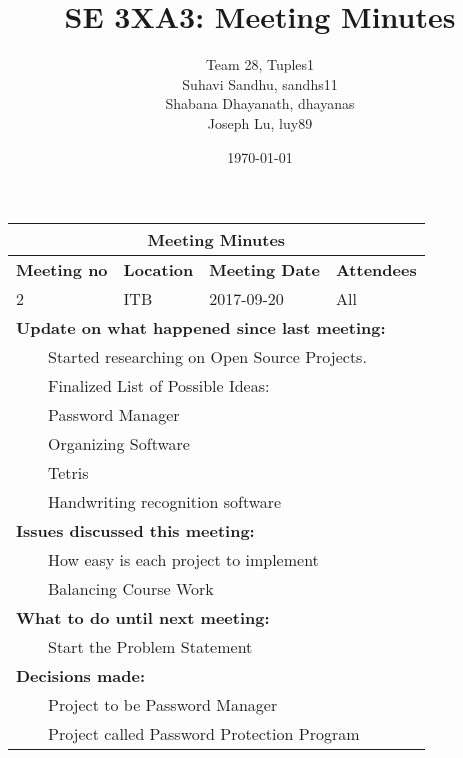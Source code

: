 \documentclass{article}
\title{SE 3XA3: Meeting Minutes}
\author{Team 28, Tuples1
		\\ Suhavi Sandhu, sandhs11
		\\ Shabana Dhayanath, dhayanas
		\\ Joseph Lu, luy89
}
\date{\today}
\newcommand{\tabitem}{~~\llap{\textbullet}~~}
\begin{document}
\begin{tabularx}{\textwidth}{ |X||X||X||X| }
    \hline
    \hline
        \multicolumn{4}{|c|}{\textbf{Meeting Minutes}} \\ 
    \hline
    \hline

    \textbf{Meeting no} & \textbf{Location} & \textbf{Meeting Date} & \textbf{Attendees}\\
    \hline

    2 & ITB & 2017-09-20 & All\\

    \hline

    \multicolumn{4}{|l|}{\textbf{Update on what happened since last meeting: }} \\
		
	\multicolumn{4}{|l|}{\tabitem Started researching on Open Source Projects.}\\
	\multicolumn{4}{|l|}{\tabitem Finalized List of Possible Ideas:}\\
		\multicolumn{4}{|l|}{\quad\tabitem Password Manager}\\
		\multicolumn{4}{|l|}{\quad\tabitem Organizing Software}\\
		\multicolumn{4}{|l|}{\quad\tabitem Tetris}\\
		\multicolumn{4}{|l|}{\quad\tabitem Handwriting recognition software}\\

    \hline
    
    \multicolumn{4}{|l|}{\textbf{Issues discussed this meeting: }}\\

    \multicolumn{4}{|l|}{\tabitem How easy is each project to implement}\\
    \multicolumn{4}{|l|}{\tabitem Balancing Course Work}\\ 

    \hline

    \multicolumn{4}{|l|}{\textbf{What to do until next meeting: }} \\

    \multicolumn{4}{|l|}{\tabitem Start the Problem Statement}\\

    \hline
    
	\multicolumn{4}{|l|}{\textbf{Decisions made: }} \\

	\multicolumn{4}{|l|}{\tabitem Project to be Password Manager}\\
	\multicolumn{4}{|l|}{\tabitem Project called Password Protection Program}\\

    \hline
\end{tabularx}
\end{document}
